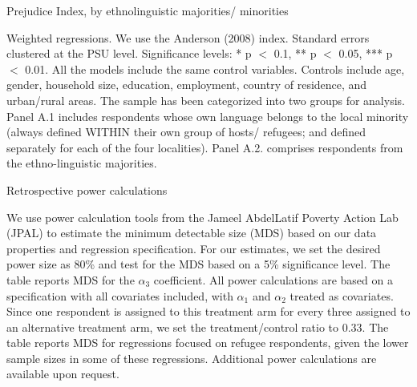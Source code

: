 \documentclass[a4paper,12pt]{article}
\renewcommand{\footnotesize}{\fontsize{8pt}{9pt}\selectfont}
\begin{document}
\begin{appendix}
\begin{table}[H]
	\footnotesize
	\caption{Prejudice Index, by ethnolinguistic majorities/ minorities}
	\label{tab:het_major}
	\centering
	\begin{threeparttable}

		

\begin{tablenotes}
	\footnotesize
	\item Weighted regressions. We use the Anderson (2008) index. Standard errors clustered at the PSU level. Significance levels: * p $<$ 0.1, ** p $<$ 0.05, *** p $<$ 0.01. All the models include the same control variables. Controls include age, gender, household size, education, employment, country of residence, and urban/rural areas. The sample has been categorized into two groups for analysis. Panel A.1 includes respondents whose own language belongs to the local minority (always defined WITHIN their own group of hosts/ refugees; and defined separately for each of the four localities). Panel A.2. comprises respondents from the ethno-linguistic majorities.
\end{tablenotes}
\end{threeparttable}
\end{table} 

\vspace{1cm}

\begin{table}[H]
	\centering\footnotesize
	\caption{Retrospective power calculations}
	\label{tab:powercalculations}
	\begin{threeparttable}
		
\begin{tablenotes}
	\footnotesize
	\item We use power calculation tools from the Jameel AbdelLatif Poverty Action Lab (JPAL) to estimate the minimum detectable size (MDS) based on our data properties and regression specification. For our estimates, we set the desired power size as 80\% and test for the MDS based on a 5\% significance level. The table reports MDS for the $\alpha_3$ coefficient. All power calculations are based on a specification with all covariates included, with $\alpha_1$ and $\alpha_2$ treated as covariates. Since one respondent is assigned to this treatment arm for every three assigned to an alternative treatment arm, we set the treatment/control ratio to 0.33. The table reports MDS for regressions focused on refugee respondents, given the lower sample sizes in some of these regressions. Additional power calculations are available upon request.
\end{tablenotes}
\end{threeparttable}

\end{table}

   
	
	
            \end{appendix}
\end{document}

